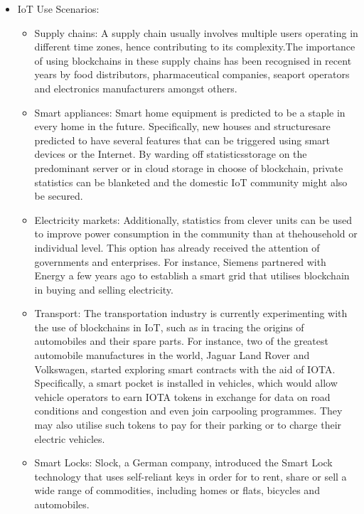 \documentclass{article}
\begin{document}
\begin{itemize}
    \item IoT Use Scenarios: 

    \begin{itemize}
        \item Supply chains: A supply chain usually involves multiple users operating in different time zones, hence contributing to its complexity.The importance of using blockchains in these supply chains has been recognised in recent years by food distributors, pharmaceutical companies, seaport operators and electronics manufacturers amongst others.

        \item Smart appliances: Smart home equipment is predicted to be a staple in every home in the future. Specifically, new houses and structuresare predicted to have several features that can be triggered using smart devices or the Internet. By warding off statisticsstorage on the predominant server or in cloud storage in choose of blockchain, private statistics can be blanketed and the domestic IoT community might also be secured.

        \item Electricity markets: Additionally, statistics from clever units can be used to improve power consumption in the community than at thehousehold or individual level. This option has already received the attention of governments and enterprises. For instance, Siemens partnered with Energy a few years ago to establish a smart grid that utilises blockchain in buying and selling electricity.

        \item Transport: The transportation industry is currently experimenting with the use of blockchains in IoT, such as in tracing the origins of automobiles and their spare parts. For instance, two of the greatest automobile manufactures in the world, Jaguar Land Rover and Volkswagen, started exploring smart contracts with the aid of IOTA. Specifically, a smart pocket is installed in vehicles, which would allow vehicle operators to earn IOTA tokens in exchange for data on road conditions and congestion and even join carpooling programmes. They may also utilise such tokens to pay for their parking or to charge their electric vehicles. 

        \item Smart Locks: Slock, a German company, introduced the Smart Lock technology that uses self-reliant keys in order for to rent, share or sell a wide range of commodities, including homes or flats, bicycles and automobiles.

    \end{itemize}
\end{itemize}
\end{document}
